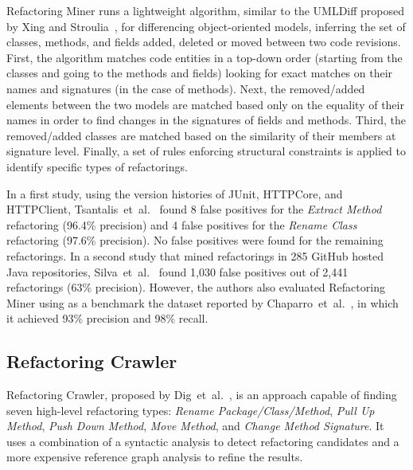 Refactoring Miner runs a lightweight algorithm, similar to the UMLDiff proposed by Xing and Stroulia~\cite{Xing:2005}, for differencing object-oriented models, inferring the set of classes, methods, and fields added, deleted or moved between two code revisions. 
First, the algorithm matches code entities in a top-down order (starting from the classes and going to the methods and fields) looking for exact matches on their names and signatures (in the case of methods).
Next, the removed/added elements between the two models are matched based only on the equality of their names in order to find changes in the signatures of fields and methods.
Third, the removed/added classes are matched based on the similarity of their members at signature level.
Finally, a set of rules enforcing structural constraints is applied to identify specific types of refactorings.

In a first study, using the version histories of JUnit, HTTPCore, and HTTPClient, Tsantalis~et~al.~\cite{tsantalis_empiricalstudy} found 8 false positives for the \emph{Extract Method} refactoring (96.4\% precision) and 4 false positives for the \emph{Rename Class} refactoring (97.6\% precision). No false positives were found for the remaining refactorings.
In a second study that mined refactorings in 285 GitHub hosted Java repositories, Silva~et~al.~\cite{fse2016-why-we-refactor} found 1,030 false positives out of 2,441 refactorings (63\% precision). However, the authors also evaluated Refactoring Miner using as a benchmark the dataset reported by Chaparro~et~al.~\cite{Chaparro:2014}, in which it achieved 93\% precision and 98\% recall.


\subsection{Refactoring Crawler}

Refactoring Crawler, proposed by Dig~et~al.~\cite{dig2006automated}, is an approach capable of finding seven high-level refactoring types: \emph{Rename Package/Class/Method}, \emph{Pull Up Method}, \emph{Push Down Method}, \emph{Move Method}, and \emph{Change Method Signature}.
It uses a combination of a syntactic analysis to detect refactoring candidates and a more expensive reference graph analysis to refine the results.


